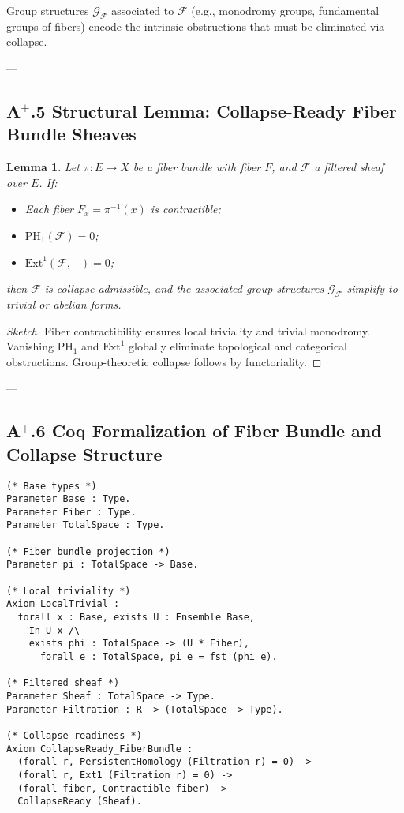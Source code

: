 \documentclass[11pt]{article}
\newtheorem{lemma}[theorem]{Lemma}
\begin{document}
Group structures $\mathcal{G}_{\mathcal{F}}$ associated to $\mathcal{F}$ (e.g., monodromy groups, fundamental groups of fibers) encode the intrinsic obstructions that must be eliminated via collapse.

---

\subsection*{A$^{+}$.5 Structural Lemma: Collapse-Ready Fiber Bundle Sheaves}

\begin{lemma}
Let $\pi : E \to X$ be a fiber bundle with fiber $F$, and $\mathcal{F}$ a filtered sheaf over $E$. If:

\begin{itemize}
    \item Each fiber $F_x = \pi^{-1}(x)$ is contractible;
    \item $\mathrm{PH}_1(\mathcal{F}) = 0$;
    \item $\mathrm{Ext}^1(\mathcal{F}, -) = 0$;
\end{itemize}

then $\mathcal{F}$ is collapse-admissible, and the associated group structures $\mathcal{G}_{\mathcal{F}}$ simplify to trivial or abelian forms.
\end{lemma}

\begin{proof}[Sketch]
Fiber contractibility ensures local triviality and trivial monodromy. Vanishing $\mathrm{PH}_1$ and $\mathrm{Ext}^1$ globally eliminate topological and categorical obstructions. Group-theoretic collapse follows by functoriality.
\end{proof}

---

\subsection*{A$^{+}$.6 Coq Formalization of Fiber Bundle and Collapse Structure}

\begin{lstlisting}[language=Coq]
(* Base types *)
Parameter Base : Type.
Parameter Fiber : Type.
Parameter TotalSpace : Type.

(* Fiber bundle projection *)
Parameter pi : TotalSpace -> Base.

(* Local triviality *)
Axiom LocalTrivial :
  forall x : Base, exists U : Ensemble Base,
    In U x /\
    exists phi : TotalSpace -> (U * Fiber),
      forall e : TotalSpace, pi e = fst (phi e).

(* Filtered sheaf *)
Parameter Sheaf : TotalSpace -> Type.
Parameter Filtration : R -> (TotalSpace -> Type).

(* Collapse readiness *)
Axiom CollapseReady_FiberBundle :
  (forall r, PersistentHomology (Filtration r) = 0) ->
  (forall r, Ext1 (Filtration r) = 0) ->
  (forall fiber, Contractible fiber) ->
  CollapseReady (Sheaf).
\end{lstlisting}
\end{document}

